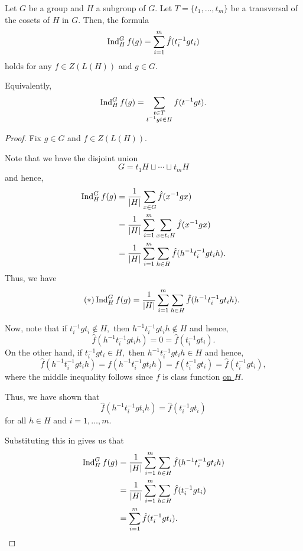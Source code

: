 \begin{prop} \label{prop:shortindformula}
	Let $G$ be a group and $H$ a subgroup of $G.$ Let $T = \{t_1, \ldots, t_m\}$ be a transversal of the cosets of $H$ in $G.$ Then, the formula
	\begin{equation*} 
		\operatorname{Ind}^{G}_{H}f(g) = \sum_{i = 1}^{m} \hat{f}(t_i^{-1}gt_i)
	\end{equation*}
	holds for any $f \in Z(L(H))$ and $g \in G.$

	Equivalently,
	\begin{equation*} 
		\operatorname{Ind}^{G}_{H}f(g) = \sum_{\substack{t \in T \\ t^{-1}gt \in H}} f(t^{-1}gt).
	\end{equation*}
\end{prop}
\begin{proof} 
	Fix $g \in G$ and $f \in Z(L(H)).$

	Note that we have the disjoint union 
	\begin{equation*} 
		G = t_1H \sqcup \cdots \sqcup t_mH
	\end{equation*}
	and hence,
	\begin{align*} 
		\operatorname{Ind}^{G}_{H}f(g) &= \frac{1}{{\left\lvert H \right\lvert}} \sum_{x \in G} \hat{f}(x^{-1}gx)\\
		&= \frac{1}{{\left\lvert H \right\lvert}} \sum_{i = 1}^{m} \sum_{x \in t_iH} \hat{f}(x^{-1}gx)\\
		&= \frac{1}{{\left\lvert H \right\lvert}} \sum_{i = 1}^{m} \sum_{h \in H} \hat{f}(h^{-1}t_i^{-1}gt_ih).
	\end{align*}
	Thus, we have
	\begin{equation} \tag{$*$} \label{eq:005}
		\operatorname{Ind}^{G}_{H}f(g) = \frac{1}{{\left\lvert H \right\lvert}} \sum_{i = 1}^{m} \sum_{h \in H} \hat{f}(h^{-1}t_i^{-1}gt_ih).
	\end{equation}

	Now, note that if $t_i^{-1}gt_i \notin H,$ then $h^{-1}t_i^{-1}gt_ih \notin H$ and hence,
	\begin{equation*} 
		\hat{f}(h^{-1}t_i^{-1}gt_ih) = 0 = \hat{f}(t_i^{-1}gt_i).
	\end{equation*}
	On the other hand, if $t_i^{-1}gt_i \in H,$ then $h^{-1}t_i^{-1}gt_ih \in H$ and hence,
	\begin{equation*} 
		\hat{f}(h^{-1}t_i^{-1}gt_ih) = f(h^{-1}t_i^{-1}gt_ih) = f(t_i^{-1}gt_i) = \hat{f}(t_i^{-1}gt_i),
	\end{equation*}
	where the middle inequality follows since $f$ is class function \underline{on $H$}.

	Thus, we have shown that
	\begin{equation*} 
		\hat{f}(h^{-1}t_i^{-1}gt_ih) = \hat{f}(t_i^{-1}gt_i)
	\end{equation*}
	for all $h \in H$ and $i = 1, \ldots, m.$

	Substituting this in  gives us that
	\begin{align*} 
		\operatorname{Ind}^{G}_{H}f(g) &= \frac{1}{{\left\lvert H \right\lvert}} \sum_{i = 1}^{m} \sum_{h \in H} \hat{f}(h^{-1}t_i^{-1}gt_ih)\\
		&=  \frac{1}{{\left\lvert H \right\lvert}} \sum_{i = 1}^{m} \sum_{h \in H} \hat{f}(t_i^{-1}gt_i)\\
		&= \sum_{i = 1}^{m} \hat{f}(t_i^{-1}gt_i). \qedhere
	\end{align*}
\end{proof}

